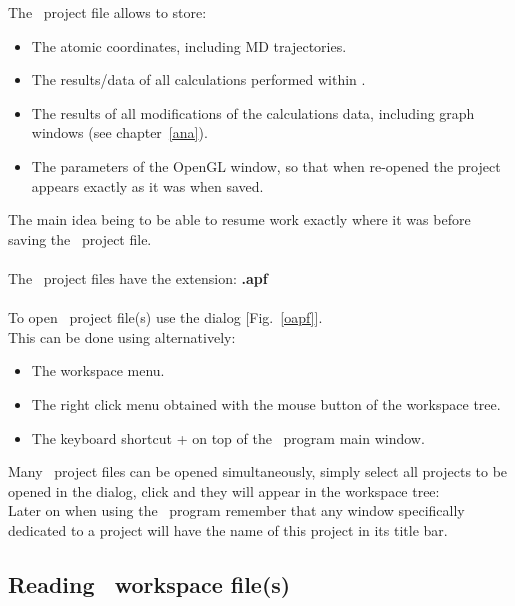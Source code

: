 The \atomes\ project file allows to store:
\begin{itemize}
\item The atomic coordinates, including MD trajectories.
\item The results/data of all calculations performed within \atomes. 
\item The results of all modifications of the calculations data, including graph windows (see chapter~\ref{ana}). 
\item The parameters of the OpenGL window, so that when re-opened the project appears exactly as it was when saved. 
\end{itemize}
The main idea being to be able to resume work exactly where it was before saving the \atomes\ project file. \\
\\The \atomes\ project files have the extension: {\bf{.apf}} \\
\\
To open \atomes\ project file(s) use the  dialog [Fig.~\ref{oapf}]. \\
This can be done using alternatively: 
\begin{itemize}
\item The workspace menu.
\item The right click menu obtained with the mouse button of the workspace tree.
\item The keyboard shortcut \Ctrl +  on top of the \atomes\ program main window.
\end{itemize}
Many \atomes\ project files can be opened simultaneously, simply select all projects to be opened in the  dialog, click  and they will appear in the workspace tree: \\
\oapfig
\laf Later on when using the \atomes\ program remember that any window specifically dedicated to a project will have the name of this project in its title bar. 
\clearpage

\subsection{Reading \atomes\ workspace file(s)}
\label{awf}

